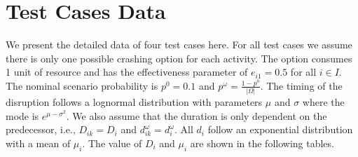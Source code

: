 \documentclass[11pt]{article}
\begin{document}
	\section{Test Cases Data} \label{appen:data}
	We present the detailed data of four test cases here. For all test cases we assume there is only one possible crashing option for each activity. The option consumes 1 unit of resource and has the effectiveness parameter of \(e_{i1} = 0.5\) for all \(i \in I\). The nominal scenario probability is \(p^0 = 0.1\) and \(p^\omega = \frac{1 - p^0}{|\Omega|}\). The timing of the disruption follows a lognormal distribution with parameters \(\mu\) and \(\sigma\) where the mode is \(e^{\mu - \sigma^2}\). We also assume that the duration is only dependent on the predecessor, i.e., \(D_{ik} = D_i\) and \(d_{ik}^\omega = d_i^\omega\). All \(d_i\) follow an exponential distribution with a mean of \(\mu_i\). The value of \(D_i\) and \(\mu_i\) are shown in the following tables.
	\pagebreak
\end{document}
